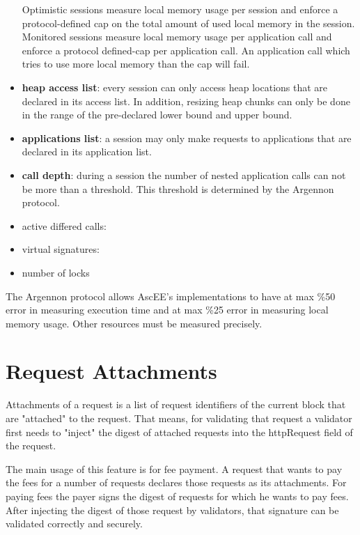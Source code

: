 \begin{itemize}
    Optimistic sessions measure local memory usage per session and enforce a protocol-defined cap on the total amount of
    used local memory in the session. Monitored sessions measure local memory usage per
    application call and enforce a protocol defined-cap per application call. An application call which tries to use
    more local memory than the cap will fail.
    \item \textbf{heap access list}:
    every session can only access heap locations that are declared in its access list. In addition,
    resizing heap chunks can only be done in the range of the pre-declared lower bound and upper bound.
    \item \textbf{applications list}:
    a session may only make requests to applications that are declared in its application list.
    \item \textbf{call depth}:
    during a session the number of nested application calls can not be more than a threshold. This threshold is
    determined by the Argennon protocol.
    \item active differed calls:
    \item virtual signatures:
    \item number of locks

\end{itemize}

The Argennon protocol allows AscEE's implementations to have at max \%50 error in measuring execution time and at
max \%25 error in measuring local memory usage. Other resources must be measured precisely.


\section{Request Attachments}\label{sec:attachments}

Attachments of a request is a list of request identifiers of the current block that are "attached" to the request.
That means, for validating that request a validator first needs to "inject" the digest of attached requests into the
httpRequest field of the request.

The main usage of this feature is for fee payment. A request that wants to pay the fees for a number of requests
declares those requests as its attachments. For paying fees the payer signs the digest of requests for which he
wants to pay fees. After injecting the digest of those request by validators, that signature can be validated
correctly and securely.


